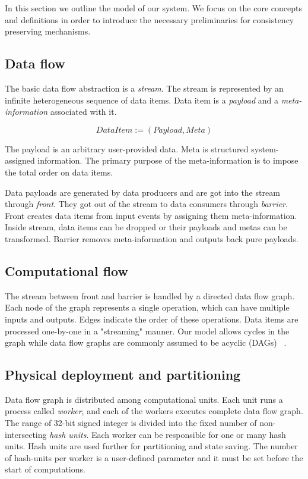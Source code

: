 
\label {fs-model-section}

In this section we outline the model of our system. We focus on the core concepts and definitions in order to introduce the necessary preliminaries for consistency preserving mechanisms.

\subsection{Data flow}
The basic data flow abstraction is a {\it stream}. The stream is represented by an infinite heterogeneous sequence of data items. Data item is a {\it payload} and a {\it meta-information} associated with it. 

\[DataItem := (Payload, Meta)\]

The payload is an arbitrary user-provided data. Meta is structured system-assigned information. The primary purpose of the meta-information is to impose the total order on data items. 

Data payloads are generated by data producers and are got into the stream through {\it front}. They got out of the stream to data consumers through {\it barrier}. Front creates data items from input events by assigning them meta-information. Inside stream, data items can be dropped or their payloads and metas can be transformed. Barrier removes meta-information and outputs back pure payloads. 

\subsection{Computational flow}
The stream between front and barrier is handled by a directed data flow graph. Each node of the graph represents a single operation, which can have multiple inputs and outputs. Edges indicate the order of these operations. Data items are processed one-by-one in a "streaming" manner. Our model allows cycles in the graph while data flow graphs are commonly assumed to be acyclic (DAGs) 
~\cite{Zaharia:2016:ASU:3013530.2934664, Carbone:2017:SMA:3137765.3137777}.

\subsection{Physical deployment and partitioning}
Data flow graph is distributed among computational units. Each unit runs a process called {\it worker}, and each of the workers executes complete data flow graph. The range of 32-bit signed integer is divided into the fixed number of non-intersecting {\it hash units}. Each worker can be responsible for one or many hash units. Hash units are used further for partitioning and state saving. The number of hash-units per worker is a user-defined parameter and it must be set before the start of computations. 

